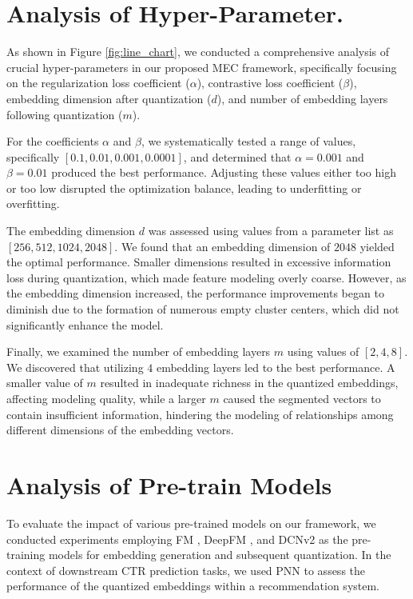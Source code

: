 \section{Analysis of Hyper-Parameter.}
\label{app:hyper}
    
    
    As shown in Figure \ref{fig:line_chart}, we conducted a comprehensive analysis of crucial hyper-parameters in our proposed MEC framework, specifically focusing on the regularization loss coefficient ($\alpha$), contrastive loss coefficient ($\beta$), embedding dimension after quantization ($d$), and number of embedding layers following quantization ($m$).
 
    
    For the coefficients $\alpha$ and $\beta$, we systematically tested a range of values, specifically $[0.1, 0.01, 0.001, 0.0001]$, and determined that $\alpha = 0.001$ and $\beta = 0.01$ produced the best performance. 
    Adjusting these values either too high or too low disrupted the optimization balance, leading to underfitting or overfitting.  
    
    The embedding dimension $d$ was assessed using values from a parameter list as $[256, 512, 1024, 2048]$. We found that an embedding dimension of $2048$ yielded the optimal performance. 
    Smaller dimensions resulted in excessive information loss during quantization, which made feature modeling overly coarse. 
    However, as the embedding dimension increased, the performance improvements began to diminish due to the formation of numerous empty cluster centers, which did not significantly enhance the model.  
    
    Finally, we examined the number of embedding layers $m$ using values of $[2, 4, 8]$. 
    We discovered that utilizing $4$ embedding layers led to the best performance. A smaller value of $m$ resulted in inadequate richness in the quantized embeddings, affecting modeling quality, while a larger $m$ caused the segmented vectors to contain insufficient information, hindering the modeling of relationships among different dimensions of the embedding vectors.






\section{\textbf{Analysis of Pre-train Models}}
\label{app:pretrain_models}
    To evaluate the impact of various pre-trained models on our framework, we conducted experiments employing FM \cite{FM}, DeepFM \cite{DeepFM}, and DCNv2 \cite{DCNv2} as the pre-training models for embedding generation and subsequent quantization. In the context of downstream CTR prediction tasks, we used PNN \cite{PNN} to assess the performance of the quantized embeddings within a recommendation system.
    
